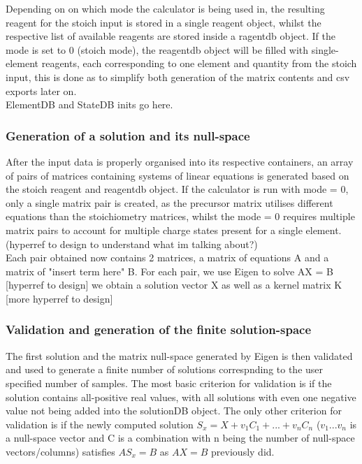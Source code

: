 Depending on on which mode the calculator is being used in, the resulting reagent for the stoich input is stored in a single reagent object, whilst the respective list of available reagents are stored inside a ragentdb object. If the mode is set to 0 (stoich mode), the reagentdb object will be filled with single-element reagents, each corresponding to one element and quantity from the stoich input, this is done as to simplify both generation of the matrix contents and csv exports later on. \\

ElementDB and StateDB inits go here. \\

\subsubsection{Generation of a solution and its null-space}
After the input data is properly organised into its respective containers, an array of pairs of matrices containing systems of linear equations is generated based on the stoich reagent and reagentdb object. If the calculator is run with mode = 0, only a single matrix pair is created, as the precursor matrix utilises different equations than the stoichiometry matrices, whilst the mode = 0 requires multiple matrix pairs to account for multiple charge states present for a single element. (hyperref to design to understand what im talking about?) \\

Each pair obtained now contains 2 matrices, a matrix of equations A and a matrix of "insert term here" B. For each pair, we use Eigen to solve AX = B [hyperref to design] we obtain a solution vector X as well as a kernel matrix K [more hyperref to design] \\

\subsubsection{Validation and generation of the finite solution-space}
The first solution and the matrix null-space generated by Eigen is then validated and used to generate a finite number of solutions correspnding to the user specified number of samples. The most basic criterion for validation is if the solution contains all-positive real values, with all solutions with even one negative value not being added into the solutionDB object. The only other criterion for validation is if the newly computed solution $S_{x} = X + v_{1}C_{1} + ... + v_{n}C_{n}$ ($v_{1} ... v_{n}$ is a null-space vector and C is a combination with n being the number of null-space vectors/columns) satisfies $AS_{x} = B$ as $AX = B$ previously did. \\

